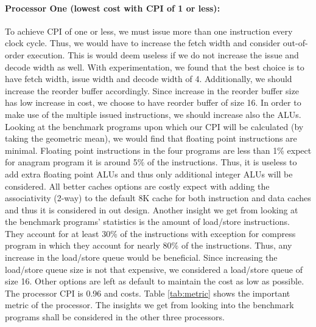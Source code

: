 \documentclass[12pt] {article}
\begin{document}
\paragraph{Processor One (lowest cost with CPI of 1 or less):}
To achieve CPI of one or less, we must issue more than one instruction every clock cycle. Thus, we would have to increase the fetch width and consider out-of-order execution. This is would deem useless if we do not increase the issue and decode width as well. With experimentation, we found that the best choice is to have fetch width, issue width and decode width of 4. Additionally, we should increase the reorder buffer accordingly. Since increase in the reorder buffer size has low increase in cost, we choose to have reorder buffer of size 16. In order to make use of the multiple issued instructions, we should increase also the ALUs. Looking at the benchmark programs upon which our CPI will be calculated (by taking the geometric mean), we would find that floating point instructions are minimal. Floating point instructions in the four programs are less than 1\% expect for anagram program it is around 5\% of the instructions. Thus, it is useless to add extra floating point ALUs and thus only additional integer ALUs will be considered. All better caches options are costly expect with adding the associativity (2-way) to the default 8K cache for both instruction and data caches and thus it is considered in out design. Another insight we get from looking at the benchmark programs' statistics is the amount of load/store instructions. They account for at least 30\% of the instructions with exception for compress program in which they account for nearly 80\% of the instructions. Thus, any increase in the load/store queue would be beneficial. Since increasing the load/store queue size is not that expensive, we considered a load/store queue of size 16. Other options are left as default to maintain the cost as low as possible. The processor CPI is 0.96 and costs. Table \ref{tab:metric} shows the important metric of the processor. The insights we get from looking into the benchmark programs shall be considered in the other three processors. 

\end{document}
